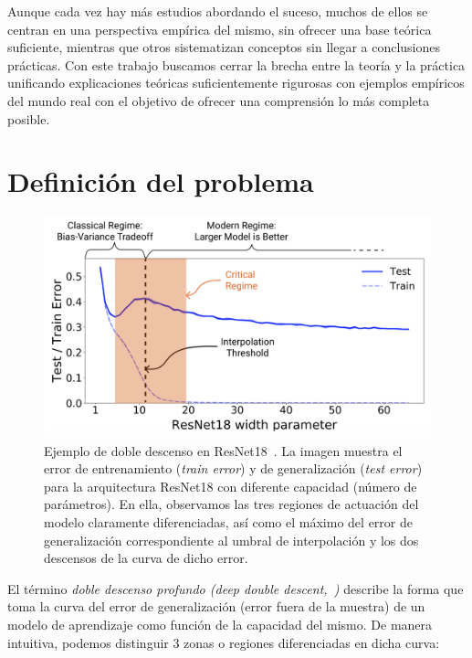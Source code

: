 Aunque cada vez hay más estudios abordando el suceso, muchos de ellos se centran en una perspectiva empírica del mismo, sin ofrecer una base teórica suficiente, mientras que otros sistematizan conceptos sin llegar a conclusiones prácticas. Con este trabajo buscamos cerrar la brecha entre la teoría y la práctica unificando explicaciones teóricas suficientemente rigurosas con ejemplos empíricos del mundo real con el objetivo de ofrecer una comprensión lo más completa posible.\newline


\section{Definición del problema}

\begin{figure}[h]
    \centering
    \includegraphics[width=\textwidth]{img/problem-definition.png}
    \caption[Ejemplo de doble descenso profundo en ResNet18~\cite{Nakkiran2019}.] {Ejemplo de doble descenso en ResNet18~\cite{Nakkiran2019}. La imagen muestra el error de entrenamiento (\textit{train error}) y de generalización (\textit{test error}) para la arquitectura ResNet18 con diferente capacidad (número de parámetros). En ella, observamos las tres regiones de actuación del modelo claramente diferenciadas, así como el máximo del error de generalización correspondiente al umbral de interpolación y los dos descensos de la curva de dicho error.}\label{fig:ejemplo-definicion-double-descent}
\end{figure}

El término \emph{doble descenso profundo (deep double descent,~\cite{Belkin2019})} describe la forma que toma la curva del error de generalización (error fuera de la muestra) de un modelo de aprendizaje como función de la capacidad del mismo. De manera intuitiva, podemos distinguir 3 zonas o regiones diferenciadas en dicha curva:

